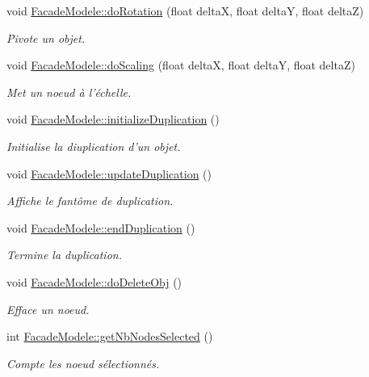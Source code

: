 \begin{DoxyCompactItemize}
void \hyperlink{group__inf2990_ga51bb0f8d8e9a6c421ca688e83e10d670}{Facade\-Modele\-::do\-Rotation} (float delta\-X, float delta\-Y, float delta\-Z)
\begin{DoxyCompactList}\small\item\em Pivote un objet. \end{DoxyCompactList}\item 
void \hyperlink{group__inf2990_gac8decb6e4a3eabfa6baa89022aaab8eb}{Facade\-Modele\-::do\-Scaling} (float delta\-X, float delta\-Y, float delta\-Z)
\begin{DoxyCompactList}\small\item\em Met un noeud à l'échelle. \end{DoxyCompactList}\item 
void \hyperlink{group__inf2990_ga6f50ec221ffc9a37a80fc87b9241000e}{Facade\-Modele\-::initialize\-Duplication} ()
\begin{DoxyCompactList}\small\item\em Initialise la diuplication d'un objet. \end{DoxyCompactList}\item 
void \hyperlink{group__inf2990_ga1a3e0ca25ffb4442968ce0977ca37d45}{Facade\-Modele\-::update\-Duplication} ()
\begin{DoxyCompactList}\small\item\em Affiche le fantôme de duplication. \end{DoxyCompactList}\item 
void \hyperlink{group__inf2990_ga236c0dba051c913078932ea1cf4a2e76}{Facade\-Modele\-::end\-Duplication} ()
\begin{DoxyCompactList}\small\item\em Termine la duplication. \end{DoxyCompactList}\item 
void \hyperlink{group__inf2990_gaa41bbec7d5381099ca3b945b6ed2675f}{Facade\-Modele\-::do\-Delete\-Obj} ()
\begin{DoxyCompactList}\small\item\em Efface un noeud. \end{DoxyCompactList}\item 
int \hyperlink{group__inf2990_gac85e226dae7761e7e98e0df151c5a766}{Facade\-Modele\-::get\-Nb\-Nodes\-Selected} ()
\begin{DoxyCompactList}\small\item\em Compte les noeud sélectionnés. \end{DoxyCompactList}\item 

\end{DoxyCompactItemize}
